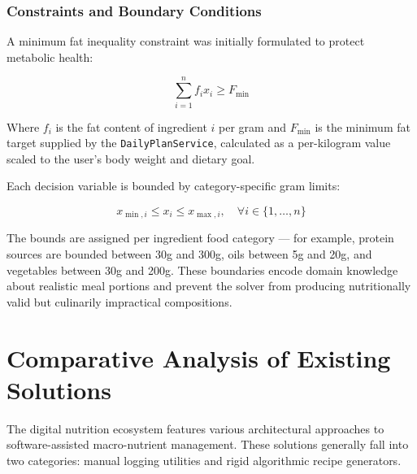 \subsubsection{Constraints and Boundary Conditions}
A minimum fat inequality constraint was initially formulated to protect metabolic health:

\begin{equation}
\sum_{i=1}^{n} f_i x_i \ge F_{\text{min}}
\end{equation}

Where $f_i$ is the fat content of ingredient $i$ per gram and $F_{\text{min}}$ is
the minimum fat target supplied by the \texttt{DailyPlanService}, calculated as a
per-kilogram value scaled to the user's body weight and dietary goal.

Each decision variable is bounded by category-specific gram limits:

\begin{equation}
x_{\min, i} \le x_i \le x_{\max, i}, \quad \forall i \in \{1, \dots, n\}
\end{equation}

The bounds are assigned per ingredient food category — for example, protein
sources are bounded between 30g and 300g, oils between 5g and 20g, and
vegetables between 30g and 200g. These boundaries encode domain knowledge about
realistic meal portions and prevent the solver from producing nutritionally valid
but culinarily impractical compositions.

\section{Comparative Analysis of Existing Solutions}

The digital nutrition ecosystem features various architectural approaches to 
software-assisted macro-nutrient management. These solutions generally fall into 
two categories: manual logging utilities and rigid algorithmic recipe generators. 

